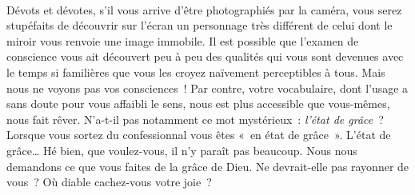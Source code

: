 \documentclass[french,twoside]{book} %
\begin{document}
\noindent  \par
Dévots et dévotes, s’il vous arrive d’être photographiés par la caméra, vous serez stupéfaits de découvrir sur l’écran un personnage très différent de celui dont le miroir vous renvoie une image immobile. Il est possible que l’examen de conscience vous ait découvert peu à peu des qualités qui vous sont devenues avec le temps si familières que vous les croyez naïvement perceptibles à tous. Mais nous ne voyons pas vos consciences ! Par contre, votre vocabulaire, dont l’usage a sans doute pour vous affaibli le sens, nous est plus accessible que vous-mêmes, nous fait rêver. N’a-t-il pas notamment ce mot mystérieux : \emph{l’état de grâce} ? Lorsque vous sortez du confessionnal vous êtes « en état de grâce ». L’état de grâce… Hé bien, que voulez-vous, il n’y paraît pas beaucoup. Nous nous demandons ce que vous faites de la grâce de Dieu. Ne devrait-elle pas rayonner de vous ? Où diable cachez-vous votre joie ?\par
\end{document}

